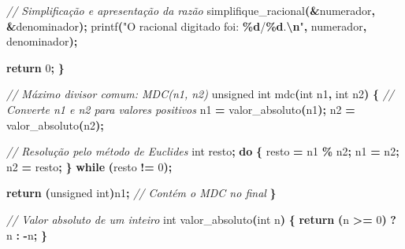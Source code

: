 \documentclass[
  11pt,
  a4paper,
]{scrbook}
\newenvironment{Shaded}{\begin{snugshade}}{\end{snugshade}}
\newcommand{\CommentTok}[1]{\textcolor[rgb]{0.56,0.35,0.01}{\textit{#1}}}
\newcommand{\ControlFlowTok}[1]{\textcolor[rgb]{0.13,0.29,0.53}{\textbf{#1}}}
\newcommand{\DataTypeTok}[1]{\textcolor[rgb]{0.13,0.29,0.53}{#1}}
\newcommand{\DecValTok}[1]{\textcolor[rgb]{0.00,0.00,0.81}{#1}}
\newcommand{\NormalTok}[1]{#1}
\newcommand{\OperatorTok}[1]{\textcolor[rgb]{0.81,0.36,0.00}{\textbf{#1}}}
\newcommand{\SpecialCharTok}[1]{\textcolor[rgb]{0.81,0.36,0.00}{\textbf{#1}}}
\newcommand{\StringTok}[1]{\textcolor[rgb]{0.31,0.60,0.02}{#1}}
\begin{document}
\begin{Shaded}
\begin{Highlighting}[]
    \CommentTok{// Simplificação e apresentação da razão}
\NormalTok{    simplifique\_racional}\OperatorTok{(\&}\NormalTok{numerador}\OperatorTok{,} \OperatorTok{\&}\NormalTok{denominador}\OperatorTok{);}
\NormalTok{    printf}\OperatorTok{(}\StringTok{"O racional digitado foi: }\SpecialCharTok{\%d}\StringTok{/}\SpecialCharTok{\%d}\StringTok{.}\SpecialCharTok{\textbackslash{}n}\StringTok{"}\OperatorTok{,}\NormalTok{ numerador}\OperatorTok{,}\NormalTok{ denominador}\OperatorTok{);}

    \ControlFlowTok{return} \DecValTok{0}\OperatorTok{;}
\OperatorTok{\}}

\CommentTok{// Máximo divisor comum: MDC(n1, n2)}
\DataTypeTok{unsigned} \DataTypeTok{int}\NormalTok{ mdc}\OperatorTok{(}\DataTypeTok{int}\NormalTok{ n1}\OperatorTok{,} \DataTypeTok{int}\NormalTok{ n2}\OperatorTok{)} \OperatorTok{\{}
    \CommentTok{// Converte n1 e n2 para valores positivos}
\NormalTok{    n1 }\OperatorTok{=}\NormalTok{ valor\_absoluto}\OperatorTok{(}\NormalTok{n1}\OperatorTok{);}
\NormalTok{    n2 }\OperatorTok{=}\NormalTok{ valor\_absoluto}\OperatorTok{(}\NormalTok{n2}\OperatorTok{);}

    \CommentTok{// Resolução pelo método de Euclides}
    \DataTypeTok{int}\NormalTok{ resto}\OperatorTok{;}
    \ControlFlowTok{do} \OperatorTok{\{}
\NormalTok{        resto }\OperatorTok{=}\NormalTok{ n1 }\OperatorTok{\%}\NormalTok{ n2}\OperatorTok{;}
\NormalTok{        n1 }\OperatorTok{=}\NormalTok{ n2}\OperatorTok{;}
\NormalTok{        n2 }\OperatorTok{=}\NormalTok{ resto}\OperatorTok{;}
    \OperatorTok{\}} \ControlFlowTok{while} \OperatorTok{(}\NormalTok{resto }\OperatorTok{!=} \DecValTok{0}\OperatorTok{);}

    \ControlFlowTok{return} \OperatorTok{(}\DataTypeTok{unsigned} \DataTypeTok{int}\OperatorTok{)}\NormalTok{n1}\OperatorTok{;}  \CommentTok{// Contém o MDC no final}
\OperatorTok{\}}

\CommentTok{// Valor absoluto de um inteiro}
\DataTypeTok{int}\NormalTok{ valor\_absoluto}\OperatorTok{(}\DataTypeTok{int}\NormalTok{ n}\OperatorTok{)} \OperatorTok{\{}
    \ControlFlowTok{return} \OperatorTok{(}\NormalTok{n }\OperatorTok{\textgreater{}=} \DecValTok{0}\OperatorTok{)} \OperatorTok{?}\NormalTok{ n }\OperatorTok{:} \OperatorTok{{-}}\NormalTok{n}\OperatorTok{;}
\OperatorTok{\}}


\end{Highlighting}
\end{Shaded}
\end{document}
